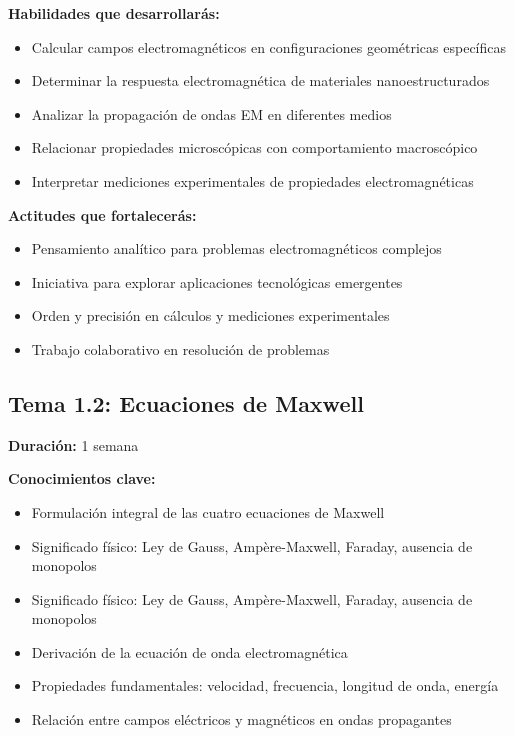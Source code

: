 \documentclass[12pt,a4paper]{book}
\begin{document}
	\begin{saberhacerbox}
		\textbf{Habilidades que desarrollarás:}
		\begin{itemize}
			\item Calcular campos electromagnéticos en configuraciones geométricas específicas
			\item Determinar la respuesta electromagnética de materiales nanoestructurados
			\item Analizar la propagación de ondas EM en diferentes medios
			\item Relacionar propiedades microscópicas con comportamiento macroscópico
			\item Interpretar mediciones experimentales de propiedades electromagnéticas
		\end{itemize}
	\end{saberhacerbox}
	
	\begin{serbox}
		\textbf{Actitudes que fortalecerás:}
		\begin{itemize}
			\item Pensamiento analítico para problemas electromagnéticos complejos
			\item Iniciativa para explorar aplicaciones tecnológicas emergentes
			\item Orden y precisión en cálculos y mediciones experimentales
			\item Trabajo colaborativo en resolución de problemas
		\end{itemize}
	\end{serbox}
	
	\subsection{Tema 1.2: Ecuaciones de Maxwell}
	\textbf{Duración:} 1 semana
	
	\begin{saberbox}
		\textbf{Conocimientos clave:}
		\begin{itemize}
			\item Formulación integral de las cuatro ecuaciones de Maxwell
			\item Significado físico: Ley de Gauss, Ampère-Maxwell, Faraday, ausencia de monopolos
			
			\item Significado físico: Ley de Gauss, Ampère-Maxwell, Faraday, ausencia de monopolos
			\item Derivación de la ecuación de onda electromagnética
			\item Propiedades fundamentales: velocidad, frecuencia, longitud de onda, energía
			\item Relación entre campos eléctricos y magnéticos en ondas propagantes
			\end{itemize}
		\end{saberbox}
	
\end{document}
